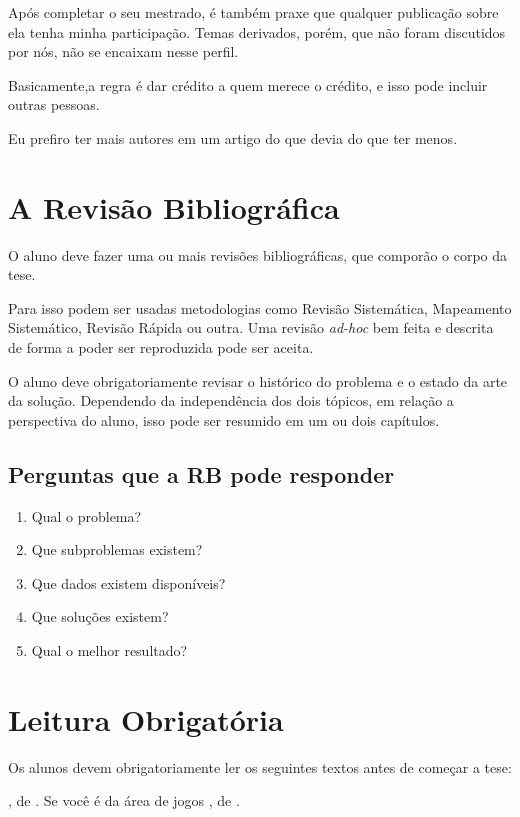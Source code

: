 \documentclass{book}
\newcommand{\listalivro}[1]{\citetitle{#1}, de \citet{#1}.}
\begin{document}
Após completar o seu mestrado, é também praxe que qualquer publicação sobre ela tenha minha participação. 
Temas derivados, porém, que não foram discutidos por nós, não se encaixam nesse perfil. 

Basicamente,a regra é dar crédito a quem merece o crédito, e isso pode incluir outras pessoas. 

Eu prefiro ter mais autores em um artigo do que devia do que ter menos.

\chapter{A Revisão Bibliográfica}

O aluno deve fazer uma ou mais revisões bibliográficas, que comporão o corpo da tese. 

Para isso podem ser usadas metodologias como Revisão Sistemática, Mapeamento Sistemático, Revisão Rápida ou outra. Uma revisão \textit{ad-hoc} bem feita e descrita de forma a poder ser reproduzida pode ser aceita.

O aluno deve obrigatoriamente revisar o histórico do problema e o estado da arte da solução. Dependendo da independência dos dois tópicos, em relação a perspectiva do aluno, isso pode ser resumido em um ou dois capítulos.

\section{Perguntas que a RB pode responder}
\begin{enumerate}
    \item Qual o problema?
    \item Que subproblemas existem?
    \item Que dados existem disponíveis?
    \item Que soluções existem? 
    \item Qual o melhor resultado?
\end{enumerate}

\chapter{Leitura Obrigatória}

Os alunos devem obrigatoriamente ler os seguintes textos antes de começar a tese:
\begin{outline}
\1 \listalivro{Dresch:2015}
\1 Se você é da área de jogos
\2 \listalivro{Xexeo:2017}
\end{outline}

\backmatter
\printbibliography
\end{document}
